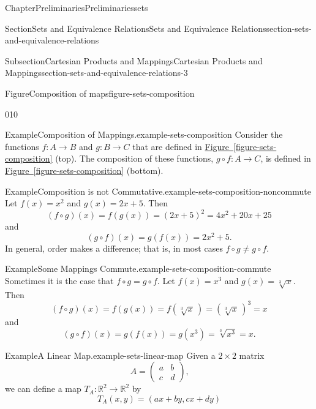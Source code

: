 \documentclass[oneside,10pt,]{book}
\newcommand{\xreffont}{\relax}
\numberwithin{equation}{section}
\begin{document}
\begin{chapterptx}{Chapter}{Preliminaries}{}{Preliminaries}{}{}{sets}
\begin{sectionptx}{Section}{Sets and Equivalence Relations}{}{Sets and Equivalence Relations}{}{}{section-sets-and-equivalence-relations}
\begin{subsectionptx}{Subsection}{Cartesian Products and Mappings}{}{Cartesian Products and Mappings}{}{}{section-sets-and-equivalence-relations-3}
\begin{figureptx}{Figure}{Composition of maps}{figure-sets-composition}{}
\begin{image}{0}{1}{0}{}
{\begin{tikzpicture}[scale=0.5]
\end{tikzpicture}%
}%
\end{image}%
\tcblower
\end{figureptx}%
\begin{example}{Example}{Composition of Mappings.}{example-sets-composition}%
Consider the functions \(f: A \rightarrow B\) and \(g: B \rightarrow C\) that are defined in \hyperref[figure-sets-composition]{Figure~{\xreffont\ref{figure-sets-composition}}} (top).  The composition of these functions, \(g \circ f: A \rightarrow C\), is defined in \hyperref[figure-sets-composition]{Figure~{\xreffont\ref{figure-sets-composition}}} (bottom).%
\end{example}
\begin{example}{Example}{Composition is not Commutative.}{example-sets-composition-noncommute}%
Let \(f(x) = x^2\) and \(g(x) = 2x + 5\). Then%
\begin{equation*}
(f \circ g)(x) = f(g(x)) = (2x + 5)^2 = 4x^2 + 20x + 25
\end{equation*}
and%
\begin{equation*}
(g \circ f)(x) = g(f(x)) = 2x^2 + 5\text{.}
\end{equation*}
In general, order makes a difference; that is, in most cases \(f \circ g \neq g \circ f\).%
\end{example}
\begin{example}{Example}{Some Mappings Commute.}{example-sets-composition-commute}%
Sometimes it is the case that \(f \circ g= g \circ f\).  Let \(f(x) = x^3\) and \(g(x) = \sqrt[3]{x}\). Then%
\begin{equation*}
(f \circ g )(x) = f(g(x)) = f( \sqrt[3]{x}\, ) = (\sqrt[3]{x}\, )^3 = x
\end{equation*}
and%
\begin{equation*}
(g \circ f )(x) = g(f(x)) = g( x^3) = \sqrt[3]{ x^3} = x\text{.}
\end{equation*}
%
\end{example}
\begin{example}{Example}{A Linear Map.}{example-sets-linear-map}%
Given a \(2 \times 2\) matrix%
\begin{equation*}
A =
\begin{pmatrix}
a & b \\
c & d
\end{pmatrix}\text{,}
\end{equation*}
we can define a map \(T_A : {\mathbb R}^2 \rightarrow {\mathbb R}^2\) by%
\begin{equation*}
T_A (x,y) = (ax + by, cx +dy)

\end{equation*}
\end{example}
\end{subsectionptx}
\end{sectionptx}
\end{chapterptx}
\end{document}
